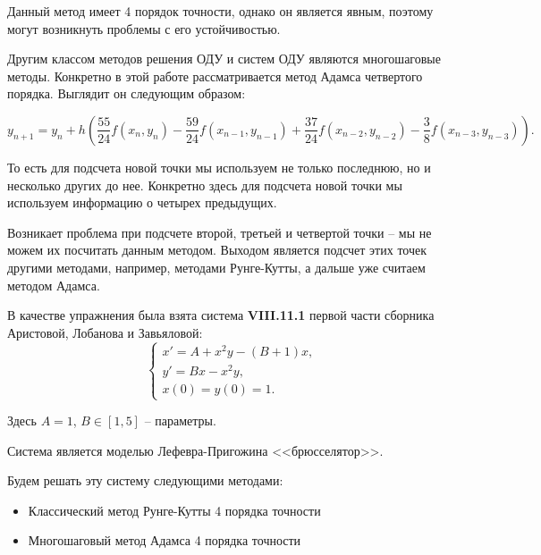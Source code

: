 		Данный метод имеет 4 порядок точности, однако он является явным, поэтому могут возникнуть проблемы с его устойчивостью.
		
		Другим классом методов решения ОДУ и систем ОДУ являются многошаговые методы. Конкретно в этой работе рассматривается метод Адамса четвертого порядка. Выглядит он следующим образом:
		
		\small
		\begin{equation*}
			y_{n+1} = y_n + h\left(\frac{55}{24}f(x_n, y_n) - \frac{59}{24}f(x_{n-1}, y_{n-1}) + \frac{37}{24}f(x_{n-2}, y_{n-2}) - \frac{3}{8}f(x_{n-3}, y_{n-3})\right).
		\end{equation*}
	
		\normalsize
	
		То есть для подсчета новой точки мы используем не только последнюю, но и несколько других до нее. Конкретно здесь для подсчета новой точки мы используем информацию о четырех предыдущих.
		
		Возникает проблема при подсчете второй, третьей и четвертой точки -- мы не можем их посчитать данным методом. Выходом является подсчет этих точек другими методами, например, методами Рунге-Кутты, а дальше уже считаем методом Адамса.
		
		
		
		В качестве упражнения была взята система \textbf{VIII.11.1} первой части сборника Аристовой, Лобанова и Завьяловой:
		\begin{equation*}
			\begin{cases}
				x' = A + x^2 y - (B + 1)x, \\
				y' = Bx - x^2 y, \\
				x(0) = y(0) = 1.
			\end{cases}
		\end{equation*}
	
		Здесь $A = 1$, $B \in [1, 5]$ -- параметры.
		
		Система является моделью Лефевра-Пригожина <<брюсселятор>>.
		
		Будем решать эту систему следующими методами:
		\begin{itemize}
			\item Классический метод Рунге-Кутты 4 порядка точности
			
			\item Многошаговый метод Адамса 4 порядка точности
		\end{itemize}
		
